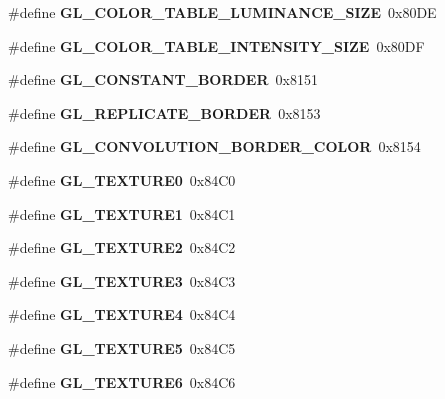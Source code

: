 \begin{DoxyCompactItemize}
\item 
\#define {\bfseries G\+L\+\_\+\+C\+O\+L\+O\+R\+\_\+\+T\+A\+B\+L\+E\+\_\+\+L\+U\+M\+I\+N\+A\+N\+C\+E\+\_\+\+S\+I\+Z\+E}~0x80\+D\+E\label{_s_d_l__opengl_8h_a7bb97bb6797e2ce543d0314bcc6f7530}

\item 
\#define {\bfseries G\+L\+\_\+\+C\+O\+L\+O\+R\+\_\+\+T\+A\+B\+L\+E\+\_\+\+I\+N\+T\+E\+N\+S\+I\+T\+Y\+\_\+\+S\+I\+Z\+E}~0x80\+D\+F\label{_s_d_l__opengl_8h_a4a290871d9e2f9022dd8e964d78bdbdb}

\item 
\#define {\bfseries G\+L\+\_\+\+C\+O\+N\+S\+T\+A\+N\+T\+\_\+\+B\+O\+R\+D\+E\+R}~0x8151\label{_s_d_l__opengl_8h_a753677dedf883b38fa6c5502b17c4e93}

\item 
\#define {\bfseries G\+L\+\_\+\+R\+E\+P\+L\+I\+C\+A\+T\+E\+\_\+\+B\+O\+R\+D\+E\+R}~0x8153\label{_s_d_l__opengl_8h_aa9566ae6ab500f9fcc95d0a0a95d7b2c}

\item 
\#define {\bfseries G\+L\+\_\+\+C\+O\+N\+V\+O\+L\+U\+T\+I\+O\+N\+\_\+\+B\+O\+R\+D\+E\+R\+\_\+\+C\+O\+L\+O\+R}~0x8154\label{_s_d_l__opengl_8h_a161f3ba1898cd146f31651c741d8daa7}

\item 
\#define {\bfseries G\+L\+\_\+\+T\+E\+X\+T\+U\+R\+E0}~0x84\+C0\label{_s_d_l__opengl_8h_a16cc91096144fc7048b45e2add14915b}

\item 
\#define {\bfseries G\+L\+\_\+\+T\+E\+X\+T\+U\+R\+E1}~0x84\+C1\label{_s_d_l__opengl_8h_a171671ae6383113df51b846373930771}

\item 
\#define {\bfseries G\+L\+\_\+\+T\+E\+X\+T\+U\+R\+E2}~0x84\+C2\label{_s_d_l__opengl_8h_a0058cf020ea54103d5533abcb2d6899c}

\item 
\#define {\bfseries G\+L\+\_\+\+T\+E\+X\+T\+U\+R\+E3}~0x84\+C3\label{_s_d_l__opengl_8h_a030cbee394ac326b01e35753a7fba1fd}

\item 
\#define {\bfseries G\+L\+\_\+\+T\+E\+X\+T\+U\+R\+E4}~0x84\+C4\label{_s_d_l__opengl_8h_a1f7d1f6b7274d0ad760d5c9bd83393e9}

\item 
\#define {\bfseries G\+L\+\_\+\+T\+E\+X\+T\+U\+R\+E5}~0x84\+C5\label{_s_d_l__opengl_8h_a7b22a0e4f5a5b887ff14d8a53ea31524}

\item 
\#define {\bfseries G\+L\+\_\+\+T\+E\+X\+T\+U\+R\+E6}~0x84\+C6\label{_s_d_l__opengl_8h_adb5131f23766351a34d36c0668d1e4de}


\end{DoxyCompactItemize}
